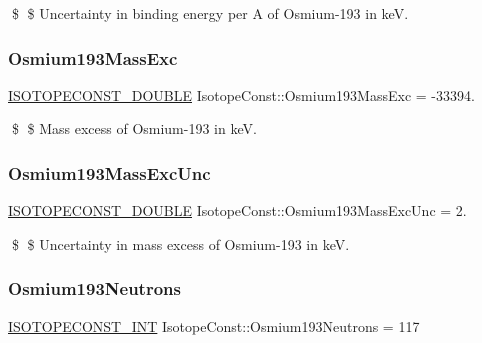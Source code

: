 \$ \$ Uncertainty in binding energy per A of Osmium-\/193 in keV. \mbox{\label{group___isotope_const-_osmium-_os193_ga5c377898e353a908cd466e191eb4cff1}} 
\subsubsection{\texorpdfstring{Osmium193\+Mass\+Exc}{Osmium193MassExc}}
{\footnotesize\ttfamily \mbox{\hyperlink{group___isotope_const-_macros_ga8f45a7272ce02c0b4c65c44636ed719a}{I\+S\+O\+T\+O\+P\+E\+C\+O\+N\+S\+T\+\_\+\+D\+O\+U\+B\+LE}} Isotope\+Const\+::\+Osmium193\+Mass\+Exc = -\/33394.}

\$ \$ Mass excess of Osmium-\/193 in keV. \mbox{\label{group___isotope_const-_osmium-_os193_ga317f9285acd5c57d26004649a86bbf31}} 
\subsubsection{\texorpdfstring{Osmium193\+Mass\+Exc\+Unc}{Osmium193MassExcUnc}}
{\footnotesize\ttfamily \mbox{\hyperlink{group___isotope_const-_macros_ga8f45a7272ce02c0b4c65c44636ed719a}{I\+S\+O\+T\+O\+P\+E\+C\+O\+N\+S\+T\+\_\+\+D\+O\+U\+B\+LE}} Isotope\+Const\+::\+Osmium193\+Mass\+Exc\+Unc = 2.}

\$ \$ Uncertainty in mass excess of Osmium-\/193 in keV. \mbox{\label{group___isotope_const-_osmium-_os193_gaa1ee9d94e0ae684cde3d64fd0a91d388}} 
\subsubsection{\texorpdfstring{Osmium193\+Neutrons}{Osmium193Neutrons}}
{\footnotesize\ttfamily \mbox{\hyperlink{group___isotope_const-_macros_ga5f18360b3e99483a35c32d789e62621c}{I\+S\+O\+T\+O\+P\+E\+C\+O\+N\+S\+T\+\_\+\+I\+NT}} Isotope\+Const\+::\+Osmium193\+Neutrons = 117}

